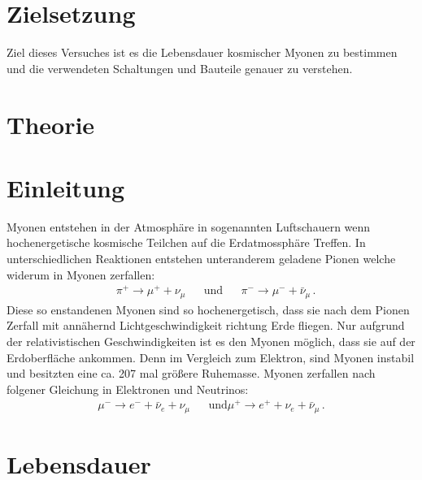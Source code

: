 \section{Zielsetzung}
    Ziel dieses Versuches ist es die Lebensdauer kosmischer Myonen zu bestimmen und die verwendeten Schaltungen und Bauteile genauer zu verstehen.

\section{Theorie}

    \section{Einleitung}
        Myonen entstehen in der Atmosphäre in sogenannten Luftschauern wenn hochenergetische kosmische Teilchen auf die Erdatmossphäre Treffen.
        In unterschiedlichen Reaktionen entstehen unteranderem geladene Pionen welche widerum in Myonen zerfallen:
        \begin{align}
            &\pi^+ \rightarrow \mu^+ + \nu_\mu && \text{und} && \pi^- \rightarrow \mu^- + \bar{\nu}_\mu \, .
        \end{align}
        Diese so enstandenen Myonen sind so hochenergetisch, dass sie nach dem Pionen Zerfall mit annähernd Lichtgeschwindigkeit richtung Erde fliegen.
        Nur aufgrund der relativistischen Geschwindigkeiten ist es den Myonen möglich, dass sie auf der Erdoberfläche ankommen. 
        Denn im Vergleich zum Elektron, sind Myonen instabil und besitzten eine ca. 207 mal größere Ruhemasse. 
        Myonen zerfallen nach folgener Gleichung in Elektronen und Neutrinos:
        \begin{align}
            \mu^- \rightarrow e^- + \bar{\nu}_e + \nu_\mu && \text{und} \mu^+ \rightarrow e^+ + \nu_e + \bar{\nu}_\mu \, . 
        \end{align} 

    \section{Lebensdauer}

